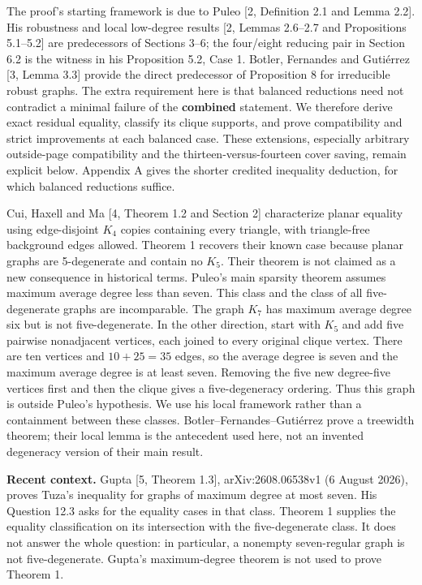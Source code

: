 \documentclass[11pt]{article}
\begin{document}
The proof's starting framework is due to Puleo {[}2, Definition 2.1 and
Lemma 2.2{]}. His robustness and local low-degree results {[}2, Lemmas
2.6--2.7 and Propositions 5.1--5.2{]} are predecessors of Sections 3--6;
the four/eight reducing pair in Section 6.2 is the witness in his
Proposition 5.2, Case 1. Botler, Fernandes and Gutiérrez {[}3, Lemma
3.3{]} provide the direct predecessor of Proposition 8 for irreducible
robust graphs. The extra requirement here is that balanced reductions
need not contradict a minimal failure of the \textbf{combined}
statement. We therefore derive exact residual equality, classify its
clique supports, and prove compatibility and strict improvements at each
balanced case. These extensions, especially arbitrary outside-page
compatibility and the thirteen-versus-fourteen cover saving, remain
explicit below. Appendix A gives the shorter credited inequality
deduction, for which balanced reductions suffice.

Cui, Haxell and Ma {[}4, Theorem 1.2 and Section 2{]} characterize
planar equality using edge-disjoint \(K_4\) copies containing every
triangle, with triangle-free background edges allowed. Theorem 1
recovers their known case because planar graphs are 5-degenerate and
contain no \(K_5\). Their theorem is not claimed as a new consequence in
historical terms. Puleo's main sparsity theorem assumes maximum average
degree less than seven. This class and the class of all five-degenerate
graphs are incomparable. The graph \(K_7\) has maximum average degree
six but is not five-degenerate. In the other direction, start with
\(K_5\) and add five pairwise nonadjacent vertices, each joined to every
original clique vertex. There are ten vertices and \(10+25=35\) edges,
so the average degree is seven and the maximum average degree is at
least seven. Removing the five new degree-five vertices first and then
the clique gives a five-degeneracy ordering. Thus this graph is outside
Puleo's hypothesis. We use his local framework rather than a containment
between these classes. Botler--Fernandes--Gutiérrez prove a treewidth
theorem; their local lemma is the antecedent used here, not an invented
degeneracy version of their main result.

\textbf{Recent context.} Gupta {[}5, Theorem 1.3{]}, arXiv:2608.06538v1
(6 August 2026), proves Tuza's inequality for graphs of maximum degree
at most seven. His Question 12.3 asks for the equality cases in that
class. Theorem 1 supplies the equality classification on its
intersection with the five-degenerate class. It does not answer the
whole question: in particular, a nonempty seven-regular graph is not
five-degenerate. Gupta's maximum-degree theorem is not used to prove
Theorem 1.
\end{document}
